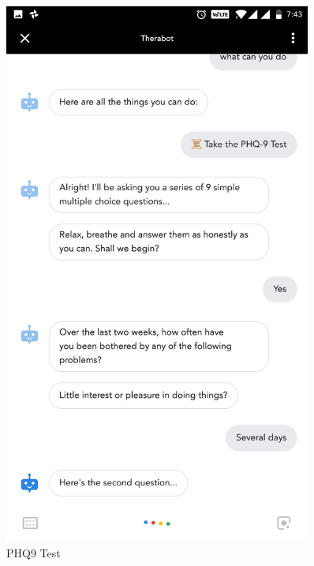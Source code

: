 \begin{figure}[H]
\begin{minipage}{0.45\textwidth}
        \includegraphics[width=0.9\textwidth]{images/screenshots/chatbot/8.jpg}
        \caption{PHQ9 Test}
    \end{minipage}
\end{figure}
\vspace*{\fill}

\pagebreak

